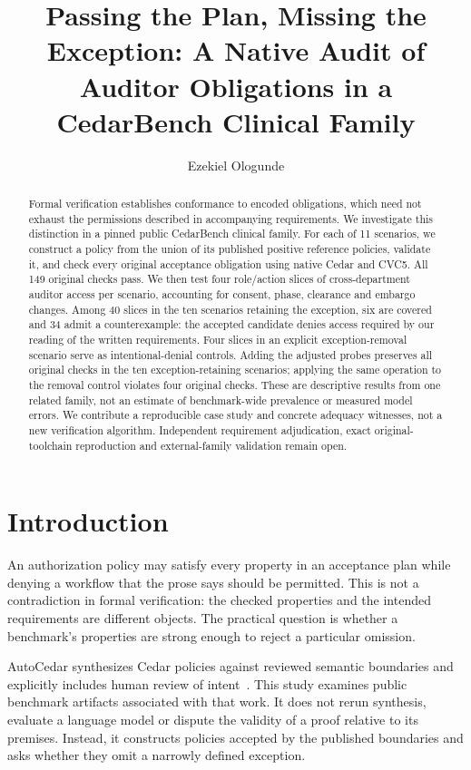 \documentclass[sigconf,nonacm]{acmart}
\title{Passing the Plan, Missing the Exception: A Native Audit of Auditor Obligations in a CedarBench Clinical Family}
\author{Ezekiel Ologunde}
\affiliation{\institution{Independent Researcher}\city{Boston}\state{MA}\country{USA}}
\begin{document}
\begin{abstract}
Formal verification establishes conformance to encoded obligations, which need not exhaust the permissions described in accompanying requirements. We investigate this distinction in a pinned public CedarBench clinical family. For each of 11 scenarios, we construct a policy from the union of its published positive reference policies, validate it, and check every original acceptance obligation using native Cedar and CVC5. All 149 original checks pass. We then test four role/action slices of cross-department auditor access per scenario, accounting for consent, phase, clearance and embargo changes. Among 40 slices in the ten scenarios retaining the exception, six are covered and 34 admit a counterexample: the accepted candidate denies access required by our reading of the written requirements. Four slices in an explicit exception-removal scenario serve as intentional-denial controls. Adding the adjusted probes preserves all original checks in the ten exception-retaining scenarios; applying the same operation to the removal control violates four original checks. These are descriptive results from one related family, not an estimate of benchmark-wide prevalence or measured model errors. We contribute a reproducible case study and concrete adequacy witnesses, not a new verification algorithm. Independent requirement adjudication, exact original-toolchain reproduction and external-family validation remain open.
\end{abstract}
\maketitle

\section{Introduction}
An authorization policy may satisfy every property in an acceptance plan while denying a workflow that the prose says should be permitted. This is not a contradiction in formal verification: the checked properties and the intended requirements are different objects. The practical question is whether a benchmark's properties are strong enough to reject a particular omission.

AutoCedar synthesizes Cedar policies against reviewed semantic boundaries and explicitly includes human review of intent~\cite{autocedar}. This study examines public benchmark artifacts associated with that work. It does not rerun synthesis, evaluate a language model or dispute the validity of a proof relative to its premises. Instead, it constructs policies accepted by the published boundaries and asks whether they omit a narrowly defined exception.
\end{document}
